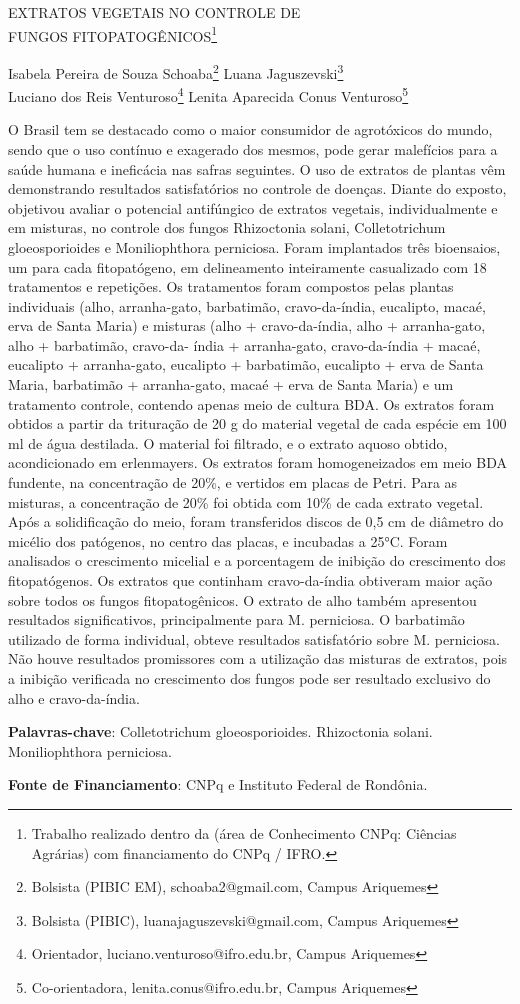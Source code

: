 \documentclass[article,12pt,onesidea,4paper,english,brazil]{abntex2}
\begin{document}
	
	
	\frenchspacing 
	
	\begin{center}
		\LARGE EXTRATOS VEGETAIS NO CONTROLE DE\\FUNGOS FITOPATOGÊNICOS\footnote{
			Trabalho realizado dentro da (área de Conhecimento CNPq: Ciências Agrárias) com financiamento
			do CNPq / IFRO.}
		
		\normalsize
		Isabela Pereira de Souza Schoaba\footnote{Bolsista (PIBIC EM), schoaba2@gmail.com, Campus Ariquemes} 
	Luana Jaguszevski\footnote{Bolsista (PIBIC), luanajaguszevski@gmail.com, Campus Ariquemes} \\
	Luciano dos Reis Venturoso\footnote{Orientador, luciano.venturoso@ifro.edu.br, Campus Ariquemes} 
	Lenita Aparecida Conus Venturoso\footnote{Co-orientadora, lenita.conus@ifro.edu.br, Campus Ariquemes} 
	\end{center}
	
	\noindent O Brasil tem se destacado como o maior consumidor de agrotóxicos do mundo,
	sendo que o uso contínuo e exagerado dos mesmos, pode gerar malefícios para a
	saúde humana e ineficácia nas safras seguintes. O uso de extratos de plantas vêm
	demonstrando resultados satisfatórios no controle de doenças. Diante do exposto,
	objetivou avaliar o potencial antifúngico de extratos vegetais, individualmente e em
	misturas, no controle dos fungos Rhizoctonia solani, Colletotrichum gloeosporioides
	e Moniliophthora perniciosa. Foram implantados três bioensaios, um para cada
	fitopatógeno, em delineamento inteiramente casualizado com 18 tratamentos e 
	repetições. Os tratamentos foram compostos pelas plantas individuais (alho,
	arranha-gato, barbatimão, cravo-da-índia, eucalipto, macaé, erva de Santa Maria) e misturas (alho + cravo-da-índia, alho + arranha-gato, alho + barbatimão, cravo-da-
	índia + arranha-gato, cravo-da-índia + macaé, eucalipto + arranha-gato, eucalipto + barbatimão, eucalipto + erva de Santa Maria, barbatimão + arranha-gato, macaé +
	erva de Santa Maria) e um tratamento controle, contendo apenas meio de cultura
	BDA. Os extratos foram obtidos a partir da trituração de 20 g do material vegetal de
	cada espécie em 100 ml de água destilada. O material foi filtrado, e o extrato aquoso
	obtido, acondicionado em erlenmayers. Os extratos foram homogeneizados em meio
	BDA fundente, na concentração de 20\%, e vertidos em placas de Petri. Para as
	misturas, a concentração de 20\% foi obtida com 10\% de cada extrato vegetal. Após
	a solidificação do meio, foram transferidos discos de 0,5 cm de diâmetro do micélio
	dos patógenos, no centro das placas, e incubadas a 25°C. Foram analisados o
	crescimento micelial e a porcentagem de inibição do crescimento dos fitopatógenos.
	Os extratos que continham cravo-da-índia obtiveram maior ação sobre todos os
	fungos fitopatogênicos. O extrato de alho também apresentou resultados
	significativos, principalmente para M. perniciosa. O barbatimão utilizado de forma
	individual, obteve resultados satisfatório sobre M. perniciosa. Não houve resultados
	promissores com a utilização das misturas de extratos, pois a inibição verificada no
	crescimento dos fungos pode ser resultado exclusivo do alho e cravo-da-índia.
	
	\vspace{\onelineskip}
	
	\noindent
	\textbf{Palavras-chave}: Colletotrichum gloeosporioides. Rhizoctonia solani. Moniliophthora
	perniciosa.
	
	\noindent
	\textbf{Fonte de Financiamento}: CNPq e Instituto Federal de Rondônia.
	
\end{document}
